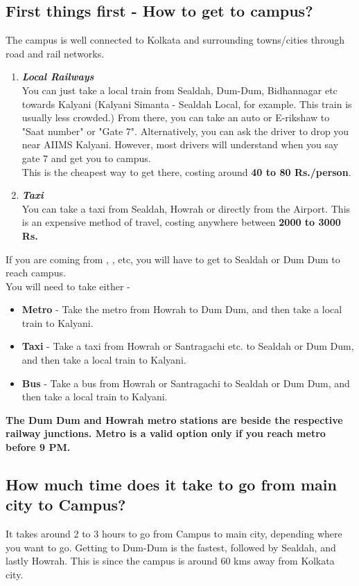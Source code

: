 \documentclass[openany]{book}
\begin{document}
\subsection{First things first - How to get to campus?} 
The campus is well connected to Kolkata and surrounding towns/cities through road and rail networks. 
\begin{enumerate}
    \item \textbf{\textit{Local Railways}} \\ You can just take a local train from Sealdah, Dum-Dum, Bidhannagar etc towards Kalyani (Kalyani Simanta - Sealdah Local, for example. This train is usually less crowded.) From there, you can take an auto or E-rikshaw to "Saat number" or "Gate 7". Alternatively, you can ask the driver to drop you near AIIMS Kalyani. However, most drivers will understand when you say gate 7 and get you to campus. \\
    This is the cheapest way to get there, costing around \textbf{40 to 80 Rs./person}.
    \item \textbf{\textit{Taxi}} \\ 
    You can take a taxi from Sealdah, Howrah or directly from the Airport. This is an expensive method of travel, costing anywhere between \textbf{2000 to 3000 Rs.} 
\end{enumerate}
\begin{mynote}
        If you are coming from , , etc, you will have to get to Sealdah or Dum Dum to reach campus. \\
        You will need to take either - 
        \begin{itemize}
            \item \textbf{Metro} - Take the metro from Howrah to Dum Dum, and then take a local train to Kalyani. 
            \item \textbf{Taxi} - Take a taxi from Howrah or Santragachi etc. to Sealdah or Dum Dum, and then take a local train to Kalyani.
            \item \textbf{Bus} - Take a bus from Howrah or Santragachi to Sealdah or Dum Dum, and then take a local train to Kalyani.
        \end{itemize}
        \textbf{The Dum Dum and Howrah metro stations are beside the respective railway junctions. Metro is a valid option only if you reach metro before 9 PM.}
\end{mynote}
\subsection{How much time does it take to go from main city to Campus?}
It takes around 2 to 3 hours to go from Campus to main city, depending where you want to go. Getting to Dum-Dum is the fastest, followed by Sealdah, and lastly Howrah. This is since the campus is around 60 kms away from Kolkata city. 
\end{document}
